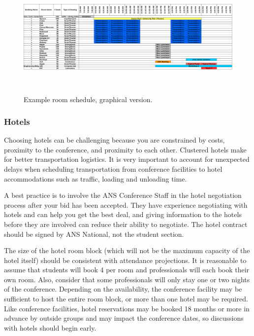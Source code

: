 \documentclass[12pt]{article}
\begin{document}
\begin{figure}[h]
\centering
\includegraphics[width=18cm, height=6cm]{example_room_schedule.png}
\caption{Example room schedule, graphical version.}
\label{fig:example_room_schedule_1}
\end{figure}

\clearpage


\subsubsection{Hotels}
Choosing hotels can be challenging because you are constrained by costs, proximity to the conference, and proximity to each other. Clustered hotels make for better transportation logistics. It is very important to account for unexpected delays when scheduling transportation from conference facilities to hotel accommodations such as traffic, loading and unloading time.

A best practice is to involve the ANS Conference Staff in the hotel negotiation process after your bid has been accepted. They have experience negotiating with hotels and can help you get the best deal, and giving information to the hotels before they are involved can reduce their ability to negotiate. The hotel contract should be signed by ANS National, not the student section.

The size of the hotel room block (which will not be the maximum capacity of the hotel itself) should be consistent with attendance projections. It is reasonable to assume that students will book 4 per room and professionals will each book their own room. Also, consider that some professionals will only stay one or two nights of the conference. Depending on the availability, the conference facility may be sufficient to host the entire room block, or more than one hotel may be required. Like conference facilities, hotel reservations may be booked 18 months or more in advance by outside groups and may impact the conference dates, so discussions with hotels should begin early.
\end{document}
